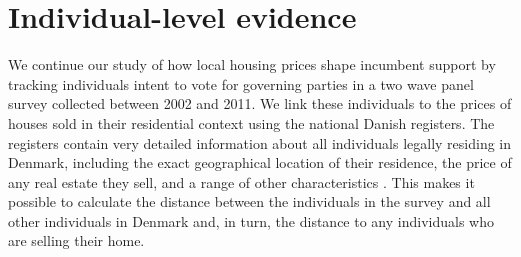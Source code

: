 \documentclass[12pt,a4paper]{article}
\begin{document}






\section{Individual-level evidence}
We continue our study of how local housing prices shape incumbent support by tracking individuals intent to vote for governing parties in a two wave panel survey collected between 2002 and 2011. We link these individuals to the prices of houses sold in their residential context using the national Danish registers. The registers contain very detailed information about all individuals legally residing in Denmark, including the exact geographical location of their residence, the price of any real estate they sell, and a range of other characteristics \citep{thygesen2011introduction}. This makes it possible to calculate the distance between the individuals in the survey and all other individuals in Denmark and, in turn, the distance to any individuals who are selling their home. 
 
\end{document}
